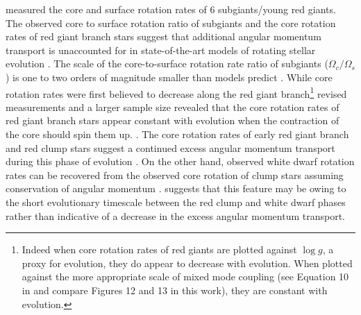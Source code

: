 \citet{deheuvels_seismic_2014} measured the core and surface rotation rates of 6 subgiants/young red giants.
The observed core to surface rotation ratio of subgiants and the core rotation rates of red giant branch stars suggest that additional angular momentum transport is unaccounted for in state-of-the-art models of rotating stellar evolution \citep{deheuvels_seismic_2014, spada_angular_2016, moyano_asteroseismology_2022}.
The scale of the core-to-surface rotation rate ratio of subgiants ($\Omega_c / \Omega_s$) is one to two orders of magnitude smaller than models predict \citep{fuller_asteroseismology_2015,spada_angular_2016,ouazzani_gamma_2018, eggenberger_asteroseismology_2019}.
While core rotation rates were first believed to decrease along the red giant branch\footnote{Indeed when core rotation rates of red giants are plotted against $\log{g}$, a proxy for evolution, they do appear to decrease with evolution. When plotted against the more appropriate scale of mixed mode coupling (see Equation 10 in \citet{gehan_core_2018} and compare Figures 12 and 13 in this work), they are constant with evolution.} \citep{mosser_spin_2012} revised measurements and a larger sample size revealed that the core rotation rates of red giant branch stars appear constant with evolution when the contraction of the core should spin them up.
\citep{mosser_spin_2012,gehan_core_2018,moyano_asteroseismology_2022}.
The core rotation rates of early red giant branch and red clump stars suggest a continued excess angular momentum transport during this phase of evolution \citep{cantiello_angular_2014,moyano_asteroseismology_2022}.
On the other hand, observed white dwarf rotation rates can be recovered from the observed core rotation of clump stars assuming conservation of angular momentum \citep{cantiello_angular_2014, den_hartogh_constraining_2019}.
\citet{cantiello_angular_2014} suggests that this feature may be owing to the short evolutionary timescale between the red clump and white dwarf phases rather than indicative of a decrease in the excess angular momentum transport.


